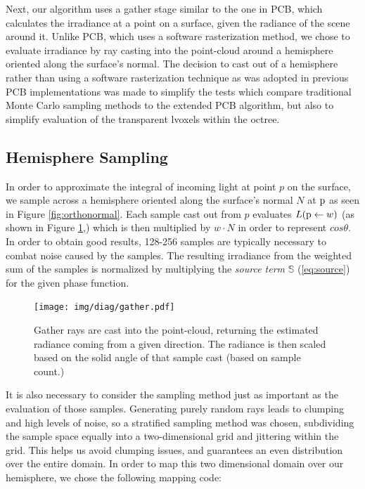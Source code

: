 \documentclass[12pt]{ucthesis}
\newcommand{\captionfonts}{\small\bf\ssp}
\begin{document}
Next, our algorithm uses a gather stage similar to the one in PCB, which calculates the irradiance at a point on a surface, given the radiance of the scene around it.  Unlike PCB, which uses a software rasterization method, we chose to evaluate irradiance by ray casting into the point-cloud around a hemisphere oriented along the surface's normal.  The decision to cast out of a hemisphere rather than using a software rasterization technique as was adopted in previous PCB implementations was made to simplify the tests which compare traditional Monte Carlo sampling methods to the extended PCB algorithm, but also to simplify evaluation of the transparent lvoxels within the octree.

\subsection{Hemisphere Sampling}

In order to approximate the integral of incoming light at point $p$ on the surface, we sample across a hemisphere oriented along the surface's normal $N$ at $\textup{p}$ as seen in Figure \ref{fig:orthonormal}.  Each sample cast out from $p$ evaluates $L(\textup{p} \leftarrow w)$ (as shown in Figure \ref{fig:gather},) which is then multiplied by $w \cdot N$ in order to represent $cos\theta$.  In order to obtain good results, 128-256 samples are typically necessary to combat noise caused by the samples.  The resulting irradiance from the weighted sum of the samples is normalized by multiplying the \textit{source term} $\mathbb{S}$ (\ref{eq:source}) for the given phase function. 

\begin{figure}[h!]
    \centering
    \texttt{[image: img/diag/gather.pdf]}
    \captionfonts
    \caption{Gather rays are cast into the point-cloud, returning the estimated radiance coming from a given direction.  The radiance is then scaled based on the solid angle of that sample cast (based on sample count.)}
    \label{fig:gather}
\end{figure}

It is also necessary to consider the sampling method just as important as the evaluation of those samples.  Generating purely random rays leads to clumping and high levels of noise, so a stratified sampling method was chosen, subdividing the sample space equally into a two-dimensional grid and jittering within the grid.  This helps us avoid clumping issues, and guarantees an even distribution over the entire domain.  In order to map this two dimensional domain over our hemisphere, we chose the following mapping code:
\end{document}
